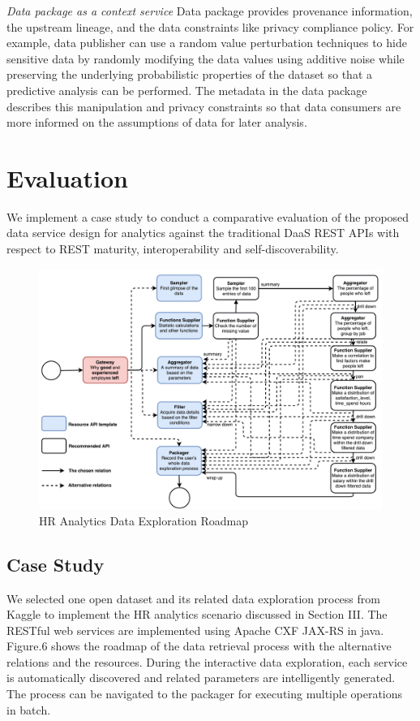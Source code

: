 \documentclass[10pt, conference, compsocconf]{IEEEtran}
\begin{document}
\textit{Data package as a context service} Data package provides provenance information, the upstream lineage, and the data constraints like privacy compliance policy. For example, data publisher can use a random value perturbation techniques to hide sensitive data by randomly modifying the data values using additive noise while preserving the underlying probabilistic properties of the dataset so that a predictive analysis can be performed. The metadata in the data package describes this manipulation and privacy constraints so that data consumers are more informed on the assumptions of data for later analysis.
\section{Evaluation}
We implement a case study to conduct a comparative evaluation of the proposed data service design for analytics against the traditional DaaS REST APIs with respect to REST maturity, interoperability and self-discoverability. 
\begin{figure}[h]
	\centering
	\includegraphics[width=1.0\textwidth]{CaseStudy}
	\caption{HR Analytics Data Exploration Roadmap}
	\label{fig.6}
\end{figure}
\subsection{Case Study}
We selected one open dataset and its related data exploration process from Kaggle\cite{kaggle} to implement the HR analytics scenario discussed in Section III. 
The RESTful web services are implemented using Apache CXF JAX-RS in java. Figure.6 shows the roadmap of the data retrieval process with the alternative relations and the resources. During the interactive data exploration, each service is automatically discovered and related parameters are intelligently generated. The process can be navigated to the packager for executing multiple operations in batch. 
\end{document}

